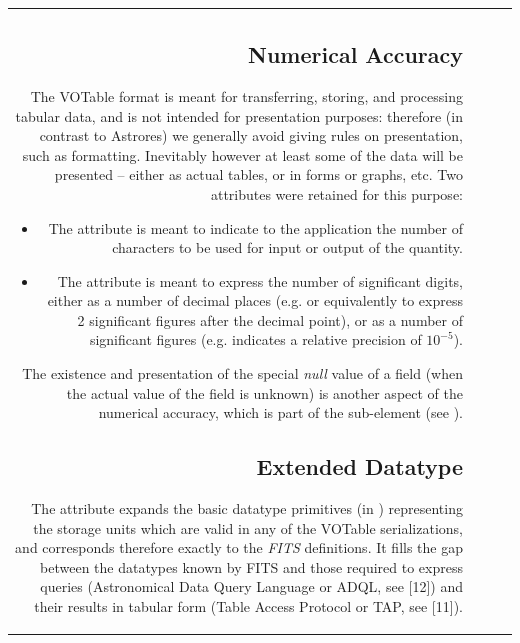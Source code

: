 \begin{tabular}{RRCp{0.8\textwidth}}
\begin{center}
\subsection{Numerical Accuracy}
\label{sec:form}


The VOTable format is meant for transferring, storing, and
processing tabular data, and is not intended for presentation
purposes: therefore (in contrast to Astrores) we generally avoid
giving rules on presentation, such as formatting. 
Inevitably however at least some of the data will be presented --
either as actual tables,  or in forms or graphs, etc.
Two attributes were retained for this purpose:

\begin{itemize}
\item   The {} attribute %
        is meant to indicate to the application
        the number of characters to be used for input
        or output of the quantity. 

\item   The  attribute is meant to express the
        number of significant digits, either as a number of
        decimal places (e.g.  or equivalently
         to express 2 significant figures
        after the decimal point), or as a number of significant figures
        (e.g.  indicates a relative precision
        of $10^{-5}$).
\end{itemize}

The existence and presentation of the special {\em null} value of 
a field (when the actual value of the field is unknown) is
another aspect of the numerical accuracy, which is part of the
 sub-element (see ).

\subsection{\texorpdfstring{Extended Datatype }
                           {Extended Datatype xtype}} \label{sec:xtype}

The  attribute expands the basic
datatype primitives (in )
representing the storage units which are valid in any of the 
VOTable serializations,
and corresponds therefore exactly to the {\em FITS} definitions.
It fills the gap between the datatypes
known by FITS and those required to express queries 
(Astronomical Data Query Language or ADQL, see [12])
and their results in tabular form (Table Access Protocol or TAP, 
see [11]).


\end{center}
\end{tabular}
